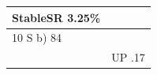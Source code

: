 \begin{tabular}{ll}
\toprule
StableSR 3.25\% &  \\
\midrule
10 S b) 84 &  \\
 & UP .17 \\
\bottomrule
\end{tabular}
